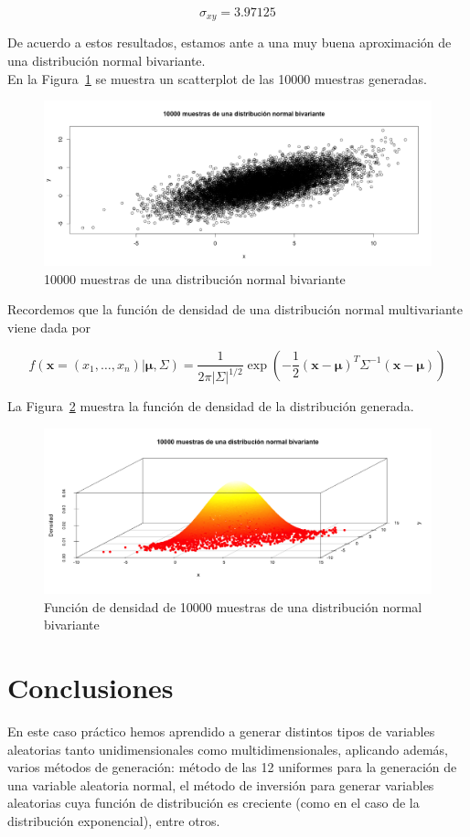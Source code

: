 \documentclass[12pt,a4paper,twoside,openright,titlepage,final]{article}
\begin{document}
\[ \sigma_{xy} = 3.97125 \]

De acuerdo a estos resultados, estamos ante a una muy buena aproximación de una distribución normal bivariante.\\

En la Figura~\ref{fig:bivariante} se muestra un scatterplot de las 10000 muestras generadas.\\

\begin{figure}[tbph!]
\centering
\includegraphics[width=0.8\linewidth]{imagenes/bivariante.png}
\caption{10000 muestras de una distribución normal bivariante}
\label{fig:bivariante}
\end{figure}

Recordemos que la función de densidad de una distribución normal multivariante viene dada por

\[ f(\mathbf{x} = (x_1,\dots, x_n) | \mathbf{\mu}, \Sigma) = \dfrac{1}{2\pi |\Sigma|^{1/2}} \exp \left( -\dfrac{1}{2} (\mathbf{x} - \mathbf{\mu})^T \Sigma^{-1} (\mathbf{x} - \mathbf{\mu}) \right) \] 

La Figura~\ref{fig:bivarianteDen} muestra la función de densidad de la distribución generada.

\begin{figure}[tbph!]
\centering
\includegraphics[width=0.8\linewidth]{imagenes/bivarianteDen.png}
\caption{Función de densidad de 10000 muestras de una distribución normal bivariante}
\label{fig:bivarianteDen}
\end{figure}


\section{Conclusiones}
En este caso práctico hemos aprendido a generar distintos tipos de variables aleatorias tanto unidimensionales como multidimensionales, aplicando además, varios métodos de generación: método de las 12 uniformes para la generación de una variable aleatoria normal, el método de inversión para generar variables aleatorias cuya función de distribución es creciente (como en el caso de la distribución exponencial), entre otros.\\
\end{document}
